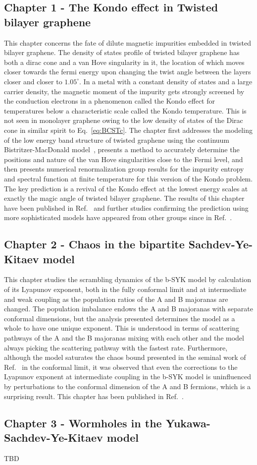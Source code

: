 \subsection{Chapter 1 - The Kondo effect in Twisted bilayer graphene}
This chapter concerns the fate of dilute magnetic impurities embedded in twisted bilayer graphene. The density of states profile of twisted bilayer graphene has both a dirac cone and a van Hove singularity in it, the location of which moves closer towards the fermi energy upon changing the twist angle between the layers closer and closer to $1.05^\circ$. In a metal with a constant density of states and a large carrier density, the magnetic moment of the impurity gets strongly screened by the conduction electrons in a phenomenon called the Kondo effect for temperatures below a characteristic scale called the Kondo temperature. This is not seen in monolayer graphene owing to the low density of states of the Dirac cone in similar spirit to Eq.~\ref{eq:BCSTc}. The chapter first addresses the modeling of the low energy band structure of twisted graphene using the continuum Bistritzer-MacDonald model~\cite{Bistritzer2011}, presents a method to accurately determine the positions and nature of the van Hove singularities close to the Fermi level, and then presents numerical renormalization group results for the impurity entropy and spectral function at finite temperature for this version of the Kondo problem. The key prediction is a revival of the Kondo effect at the lowest energy scales at exactly the magic angle of twisted bilayer graphene. The results of this chapter have been published in Ref.~\cite{shankar2023kondo} and further studies confirming the prediction using more sophisticated models have appeared from other groups since in Ref.~\cite{chang2023vacancy}. 

\subsection{Chapter 2 - Chaos in the bipartite Sachdev-Ye-Kitaev model}
This chapter studies the scrambling dynamics of the b-SYK model by calculation of its Lyapunov exponent, both in the fully conformal limit and at intermediate and weak coupling as the population ratios of the A and B majoranas are changed. The population imbalance endows the A and B majoranas with separate conformal dimensions, but the analysis presented determines the model as a whole to have one unique exponent. This is understood in terms of scattering pathways of the A and the B majoranas mixing with each other and the model always picking the scattering pathway with the fastest rate. Furthermore, although the model saturates the chaos bound presented in the seminal work of Ref.~\cite{maldacena_bound_2016} in the conformal limit, it was observed that even the corrections to the Lyapunov exponent at intermediate coupling in the b-SYK model is uninfluenced by perturbations to the conformal dimension of the A and B fermions, which is a surprising result. This chapter has been published in Ref.~\cite{shankar2023lyapunov}.


\subsection{Chapter 3 - Wormholes in the Yukawa-Sachdev-Ye-Kitaev model}

TBD
